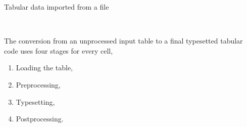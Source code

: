 \begin{fullwidth}
\begin{table*}[htbp]

\caption{Tabular data imported from a file}{~} %

\end{table*}

\end{fullwidth}


\bigskip


The conversion from an unprocessed input table to a final typesetted tabular code uses four stages for every
cell,

\begin{enumerate}
  \item  Loading the table,
  \item  Preprocessing,
  \item Typesetting,
  \item  Postprocessing.
\end{enumerate}

